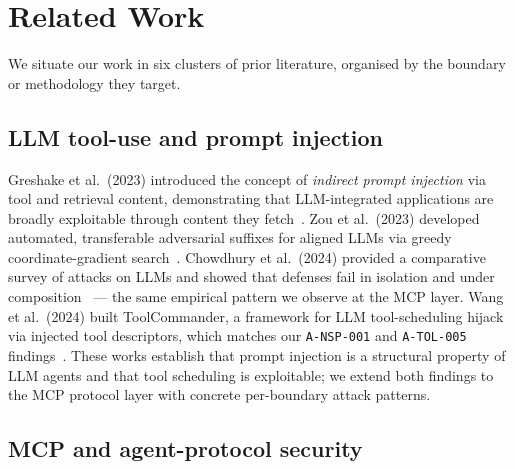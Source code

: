 
\section{Related Work}\label{sec:related}

We situate our work in six clusters of prior literature,
organised by the boundary or methodology they target.

\subsection{LLM tool-use and prompt injection}

Greshake et al.~(2023) introduced the concept of \emph{indirect
prompt injection} via tool and retrieval content, demonstrating
that LLM-integrated applications are broadly exploitable
through content they fetch~\cite{greshake_2023_indirect}. Zou
et al.~(2023) developed automated, transferable adversarial
suffixes for aligned LLMs via greedy coordinate-gradient
search~\cite{zou_2023_universal}. Chowdhury et al.~(2024)
provided a comparative survey of attacks on LLMs and showed
that defenses fail in isolation and under
composition~\cite{chowdhury_2024_defenses} --- the same
empirical pattern we observe at the MCP layer. Wang et
al.~(2024) built ToolCommander, a framework for LLM
tool-scheduling hijack via injected tool descriptors, which
matches our \texttt{A-NSP-001} and \texttt{A-TOL-005}
findings~\cite{wang_2024_toolcommander}. These works establish
that prompt injection is a structural property of LLM agents
and that tool scheduling is exploitable; we extend both
findings to the MCP protocol layer with concrete per-boundary
attack patterns.

\subsection{MCP and agent-protocol security}


